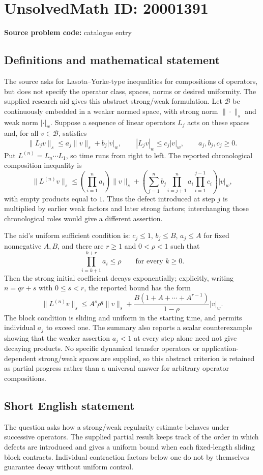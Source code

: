 \documentclass[11pt]{article}
\begin{document}
\section*{UnsolvedMath ID: 20001391}
\textbf{Source problem code:} catalogue entry
\subsection{Definitions and mathematical statement}
The source asks for Lasota--Yorke-type inequalities for compositions of operators, but does not specify the operator class, spaces, norms or desired uniformity. The supplied research aid gives this abstract strong/weak formulation. Let $\mathcal B$ be continuously embedded in a weaker normed space, with strong norm $\|\cdot\|_s$ and weak norm $|\cdot|_w$. Suppose a sequence of linear operators $L_j$ acts on these spaces and, for all $v\in\mathcal B$, satisfies
\[
 \|L_jv\|_s\leq a_j\|v\|_s+b_j|v|_w,
 \qquad |L_jv|_w\leq c_j|v|_w,
 \qquad a_j,b_j,c_j\geq0.
\]
Put $L^{(n)}=L_n\cdots L_1$, so time runs from right to left. The reported chronological composition inequality is
\[
 \|L^{(n)}v\|_s\leq
 \left(\prod_{i=1}^n a_i\right)\|v\|_s
 +\left(\sum_{j=1}^n b_j
      \prod_{i=j+1}^n a_i\prod_{i=1}^{j-1}c_i\right)|v|_w,
\]
with empty products equal to $1$. Thus the defect introduced at step $j$ is multiplied by earlier weak factors and later strong factors; interchanging those chronological roles would give a different assertion.

The aid's uniform sufficient condition is: $c_j\leq1$, $b_j\leq B$, $a_j\leq A$ for fixed nonnegative $A,B$, and there are $r\geq1$ and $0<\rho<1$ such that
\[
 \prod_{i=k+1}^{k+r}a_i\leq\rho\qquad\text{for every }k\geq0.
\]
Then the strong initial coefficient decays exponentially; explicitly, writing $n=qr+s$ with $0\leq s<r$, the reported bound has the form
\[
 \|L^{(n)}v\|_s\leq A^s\rho^q\|v\|_s
 +\frac{B(1+A+\cdots+A^{r-1})}{1-\rho}|v|_w.
\]
The block condition is sliding and uniform in the starting time, and permits individual $a_j$ to exceed one. The summary also reports a scalar counterexample showing that the weaker assertion $a_j<1$ at every step alone need not give decaying products. No specific dynamical transfer operators or application-dependent strong/weak spaces are supplied, so this abstract criterion is retained as partial progress rather than a universal answer for arbitrary operator compositions.
\subsection{Short English statement}
The question asks how a strong/weak regularity estimate behaves under successive operators. The supplied partial result keeps track of the order in which defects are introduced and gives a uniform bound when each fixed-length sliding block contracts. Individual contraction factors below one do not by themselves guarantee decay without uniform control.
\end{document}

